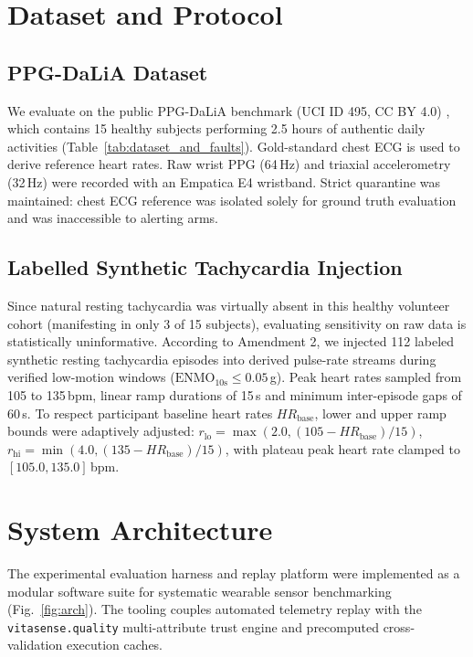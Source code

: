 \documentclass[conference]{IEEEtran}
\begin{document}
\section{Dataset and Protocol}
\subsection{PPG-DaLiA Dataset}
We evaluate on the public PPG-DaLiA benchmark (UCI ID 495, CC BY 4.0) \cite{ref_reiss_dalia}, which contains 15 healthy subjects performing 2.5 hours of authentic daily activities (Table~\ref{tab:dataset_and_faults}). Gold-standard chest ECG is used to derive reference heart rates. Raw wrist PPG (64\,Hz) and triaxial accelerometry (32\,Hz) were recorded with an Empatica E4 wristband. Strict quarantine was maintained: chest ECG reference was isolated solely for ground truth evaluation and was inaccessible to alerting arms.

\subsection{Labelled Synthetic Tachycardia Injection}
Since natural resting tachycardia was virtually absent in this healthy volunteer cohort (manifesting in only 3 of 15 subjects), evaluating sensitivity on raw data is statistically uninformative. According to Amendment 2, we injected 112 labeled synthetic resting tachycardia episodes into derived pulse-rate streams during verified low-motion windows ($\text{ENMO}_{10\text{s}} \le 0.05$\,g). Peak heart rates sampled from 105 to 135\,bpm, linear ramp durations of 15\,s and minimum inter-episode gaps of 60\,s. To respect participant baseline heart rates $HR_{\text{base}}$, lower and upper ramp bounds were adaptively adjusted: $r_{\text{lo}} = \max(2.0, (105 - HR_{\text{base}})/15)$, $r_{\text{hi}} = \min(4.0, (135 - HR_{\text{base}})/15)$, with plateau peak heart rate clamped to $[105.0, 135.0]$\,bpm.



\section{System Architecture}
The experimental evaluation harness and replay platform were implemented as a modular software suite for systematic wearable sensor benchmarking (Fig.~\ref{fig:arch}). The tooling couples automated telemetry replay with the \texttt{vitasense.quality} multi-attribute trust engine and precomputed cross-validation execution caches.
\end{document}
